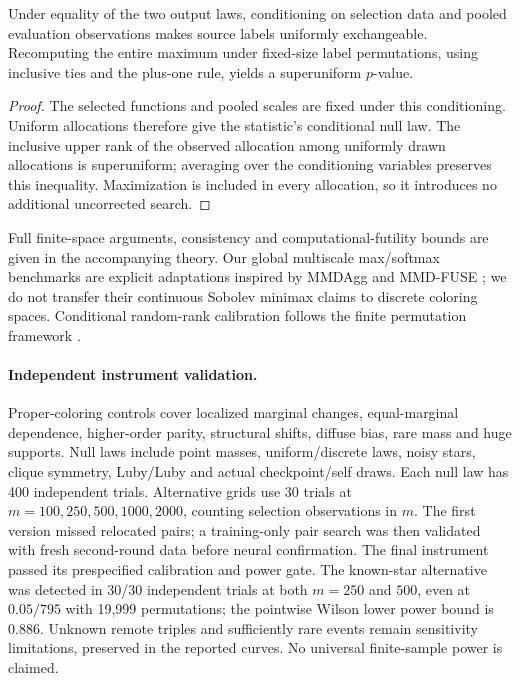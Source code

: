 \begin{proposition}
Under equality of the two output laws, conditioning on selection data and
pooled evaluation observations makes source labels uniformly exchangeable.
Recomputing the entire maximum under fixed-size label permutations, using
inclusive ties and the plus-one rule, yields a superuniform $p$-value.
\end{proposition}
\begin{proof}
The selected functions and pooled scales are fixed under this conditioning.
Uniform allocations therefore give the statistic's conditional null law.
The inclusive upper rank of the observed allocation among uniformly drawn
allocations is superuniform; averaging over the conditioning variables
preserves this inequality. Maximization is included in every allocation,
so it introduces no additional uncorrected search.
\end{proof}
Full finite-space arguments, consistency and computational-futility bounds
are given in the accompanying theory. Our global multiscale max/softmax
benchmarks are explicit adaptations inspired by MMDAgg and MMD-FUSE
\citep{schrab2023mmdagg,biggs2023mmdfuse}; we do not transfer their continuous
Sobolev minimax claims to discrete coloring spaces. Conditional random-rank
calibration follows the finite permutation framework
\citep{hemerik2018exact,phipson2010permutation}.

\paragraph{Independent instrument validation.}
Proper-coloring controls cover localized marginal changes, equal-marginal
dependence, higher-order parity, structural shifts, diffuse bias, rare mass
and huge supports. Null laws include point masses, uniform/discrete laws,
noisy stars, clique symmetry, Luby/Luby and actual checkpoint/self draws.
Each null law has 400 independent trials. Alternative grids use 30 trials
at $m=100,250,500,1000,2000$, counting selection observations in $m$.
The first version missed relocated pairs; a training-only pair search was
then validated with fresh second-round data before neural confirmation.
The final instrument passed its prespecified calibration and power gate.
The known-star alternative was detected in 30/30 independent trials at
both $m=250$ and $500$, even at $0.05/795$ with 19,999 permutations;
the pointwise Wilson lower power bound is $0.886$. Unknown remote triples
and sufficiently rare events remain sensitivity limitations, preserved
in the reported curves. No universal finite-sample power is claimed.

